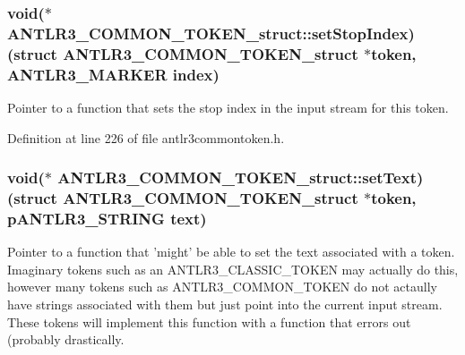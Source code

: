 \hypertarget{struct_a_n_t_l_r3___c_o_m_m_o_n___t_o_k_e_n__struct_ab84aa965cc340ca0b51f31e02da4e80b}{
\subsubsection[{set\-Stop\-Index}]{\setlength{\rightskip}{0pt plus 5cm}void($\ast$ A\-N\-T\-L\-R3\-\_\-\-C\-O\-M\-M\-O\-N\-\_\-\-T\-O\-K\-E\-N\-\_\-struct\-::set\-Stop\-Index)(struct {\bf A\-N\-T\-L\-R3\-\_\-\-C\-O\-M\-M\-O\-N\-\_\-\-T\-O\-K\-E\-N\-\_\-struct} $\ast$token, {\bf A\-N\-T\-L\-R3\-\_\-\-M\-A\-R\-K\-E\-R} {\bf index})}}\label{struct_a_n_t_l_r3___c_o_m_m_o_n___t_o_k_e_n__struct_ab84aa965cc340ca0b51f31e02da4e80b}
Pointer to a function that sets the stop index in the input stream for this token. 

Definition at line 226 of file antlr3commontoken.\-h.

\hypertarget{struct_a_n_t_l_r3___c_o_m_m_o_n___t_o_k_e_n__struct_ac13a711cff156a2a0a0f44aeb8b1537c}{
\subsubsection[{set\-Text}]{\setlength{\rightskip}{0pt plus 5cm}void($\ast$ A\-N\-T\-L\-R3\-\_\-\-C\-O\-M\-M\-O\-N\-\_\-\-T\-O\-K\-E\-N\-\_\-struct\-::set\-Text)(struct {\bf A\-N\-T\-L\-R3\-\_\-\-C\-O\-M\-M\-O\-N\-\_\-\-T\-O\-K\-E\-N\-\_\-struct} $\ast$token, {\bf p\-A\-N\-T\-L\-R3\-\_\-\-S\-T\-R\-I\-N\-G} {\bf text})}}\label{struct_a_n_t_l_r3___c_o_m_m_o_n___t_o_k_e_n__struct_ac13a711cff156a2a0a0f44aeb8b1537c}
Pointer to a function that 'might' be able to set the text associated with a token. Imaginary tokens such as an A\-N\-T\-L\-R3\-\_\-\-C\-L\-A\-S\-S\-I\-C\-\_\-\-T\-O\-K\-E\-N may actually do this, however many tokens such as A\-N\-T\-L\-R3\-\_\-\-C\-O\-M\-M\-O\-N\-\_\-\-T\-O\-K\-E\-N do not actaully have strings associated with them but just point into the current input stream. These tokens will implement this function with a function that errors out (probably drastically. 

